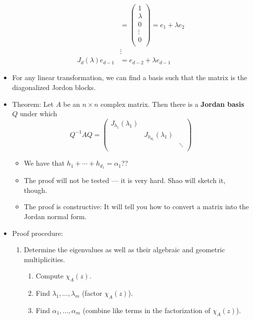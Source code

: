 \documentclass[../notes.tex]{subfiles}
\begin{document}
\begin{itemize}
\begin{align*}
        &=
        \begin{pmatrix}
            1\\
            \lambda\\
            0\\
            \vdots\\
            0\\
        \end{pmatrix}
        = e_1+\lambda e_2\\
        &\vdots\\
        J_d(\lambda)e_{d-1} &= e_{d-2}+\lambda e_{d-1}
    \end{align*}
    \item For any linear transformation, we can find a basis such that the matrix is the diagonalized Jordon blocks.
    \item Theorem: Let $A$ be an $n\times n$ complex matrix. Then there is a \textbf{Jordan basis} $Q$ under which
    \begin{equation*}
        Q^{-1}AQ =
        \begin{pmatrix}
            J_{h_1}(\lambda_1) &  & \\
             & J_{h_{d_1}}(\lambda_1) & \\
             &  & \ddots\\
        \end{pmatrix}
    \end{equation*}
    \begin{itemize}
        \item We have that $h_1+\cdots+h_{d_1}=\alpha_1$??
        \item The proof will not be tested --- it is very hard. Shao will sketch it, though.
        \item The proof is constructive: It will tell you how to convert a matrix into the Jordan normal form.
    \end{itemize}
    \item Proof procedure:
    \begin{enumerate}
        \item Determine the eigenvalues as well as their algebraic and geometric multiplicities.
        \begin{enumerate}
            \item Compute $\chi_A(z)$.
            \item Find $\lambda_1,\dots,\lambda_m$ (factor $\chi_A(z)$).
            \item Find $\alpha_1,\dots,\alpha_m$ (combine like terms in the factorization of $\chi_A(z)$).

\end{enumerate}
\end{enumerate}
\end{itemize}
\end{document}

